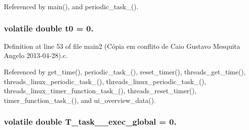 Referenced by main(), and periodic\-\_\-task\-\_().

\hypertarget{main2_01_07C_xC3_xB3pia_01em_01conflito_01de_01Caio_01Gustavo_01Mesquita_01Angelo_012013-04-28_08_8c_a86c2efd6da48b362806cdbb5b1e711d8}{
\subsubsection[{t0}]{\setlength{\rightskip}{0pt plus 5cm}volatile double t0 = 0.}}\label{main2_01_07C_xC3_xB3pia_01em_01conflito_01de_01Caio_01Gustavo_01Mesquita_01Angelo_012013-04-28_08_8c_a86c2efd6da48b362806cdbb5b1e711d8}


Definition at line 53 of file main2 (\-Cópia em conflito de Caio Gustavo Mesquita Angelo 2013-\/04-\/28).\-c.



Referenced by get\-\_\-time(), periodic\-\_\-task\-\_(), reset\-\_\-timer(), threads\-\_\-get\-\_\-time(), threads\-\_\-linux\-\_\-periodic\-\_\-task\-\_(), threads\-\_\-linux\-\_\-periodic\-\_\-task\-\_(), threads\-\_\-linux\-\_\-timer\-\_\-function\-\_\-task\-\_(), threads\-\_\-reset\-\_\-timer(), timer\-\_\-function\-\_\-task\-\_(), and ui\-\_\-overview\-\_\-data().

\hypertarget{main2_01_07C_xC3_xB3pia_01em_01conflito_01de_01Caio_01Gustavo_01Mesquita_01Angelo_012013-04-28_08_8c_acdaa4a9b0e1be3dfa53b52df6410ad3b}{
\subsubsection[{T\-\_\-task\-\_\-1\-\_\-exec\-\_\-global}]{\setlength{\rightskip}{0pt plus 5cm}volatile double T\-\_\-task\-\_\-\_\-exec\-\_\-global = 0.}}\label{main2_01_07C_xC3_xB3pia_01em_01conflito_01de_01Caio_01Gustavo_01Mesquita_01Angelo_012013-04-28_08_8c_acdaa4a9b0e1be3dfa53b52df6410ad3b}


